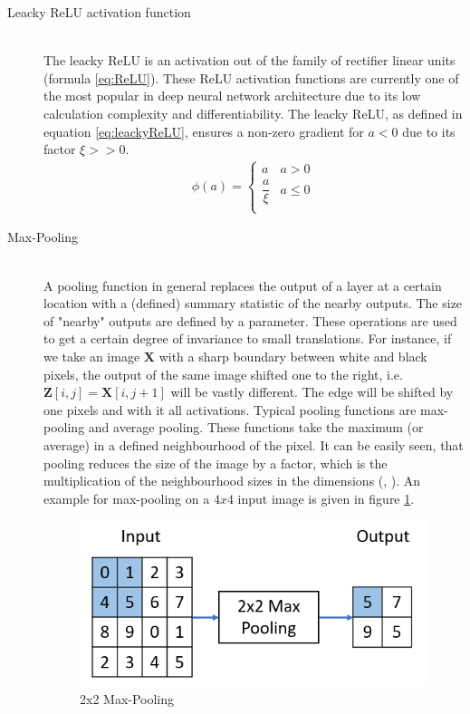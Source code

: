 \documentclass[12pt,DIV14,BCOR12mm,a4paper,footexclude,headinclude,halfparskip-,twoside,openright,cleardoubleempty,idxtotoc,bibtotoc,listtotoc]{scrreprt} %
\numberwithin{equation}{chapter}
\begin{document}
\begin{description}
	\item[Leacky ReLU activation function]\hfill \\
	The leacky ReLU \cite{Xu15LReLU} is an activation out of the family of rectifier linear units (formula \ref{eq:ReLU}). These ReLU activation functions are currently one of the most popular in deep neural network architecture due to its low calculation complexity and differentiability. The leacky ReLU, as defined in equation \ref{eq:leackyReLU}, ensures a non-zero gradient for $ a < 0$ due to its factor $\xi >> 0$.
	\begin{align}
		\phi(a) = \begin{cases} a & a > 0\\ \dfrac{a}{\xi} & a \leq 0\\ \end{cases} \label{eq:leackyReLU}
	\end{align}	
	\item[Max-Pooling]\hfill \\
	A pooling function in general replaces the output of a layer at a certain location with a (defined) summary statistic of the nearby outputs. The size of "nearby" outputs are defined by a parameter. These operations are used to get a certain degree of invariance to small translations. For instance, if we take an image $\mathbf{X}$ with a sharp boundary between white and black pixels, the output of the same image shifted one to the right, i.e. $\mathbf{Z}[i, j] = \mathbf{X}[i, j+1]$ will be vastly different. The edge will be shifted by one pixels and with it all activations. Typical pooling functions are max-pooling and average pooling. These functions take the maximum (or average) in a defined neighbourhood of the pixel. It can be easily seen, that pooling reduces the size of the image by a factor, which is the multiplication of the neighbourhood sizes in the dimensions (\cite{Goodfellow-et-al-2016}, \cite{DeepLearningDive}). An example for max-pooling on a $4x4$ input image is given in figure \ref{fig:Max-Pooling}.
\begin{figure}[htb!]
	\centering
	\includegraphics[width=0.5\linewidth]{Graphiken/2x2_MaxPooling}
	\caption{2x2 Max-Pooling}
	\label{fig:Max-Pooling}
\end{figure}	
\end{description}
\end{document}
